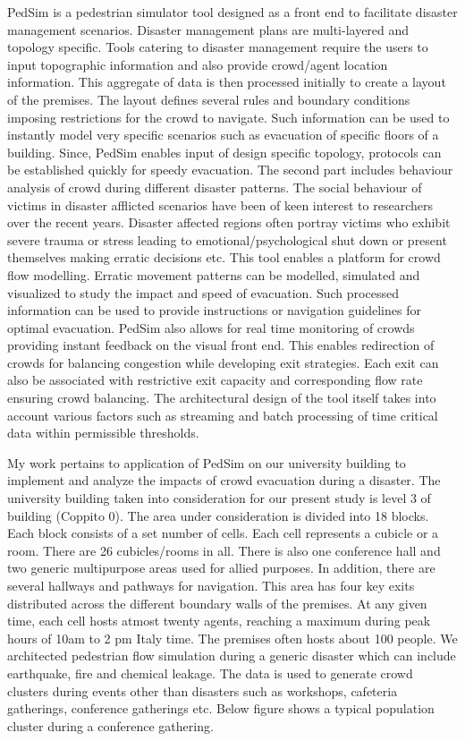 PedSim is a pedestrian simulator tool designed as a front end to facilitate disaster management scenarios. Disaster management plans are multi-layered and topology specific. Tools catering to disaster management require the users to input topographic information and also provide crowd/agent location information. This aggregate of data is then processed initially to create a layout of the premises. The layout defines several rules and boundary conditions imposing restrictions for the crowd to navigate. Such information can be used to instantly model very specific scenarios such as evacuation of specific floors of a building. Since, PedSim enables input of design specific topology, protocols can be established quickly for speedy evacuation. The second part includes behaviour analysis of crowd during different disaster patterns. The social behaviour of victims in disaster afflicted scenarios have been of keen interest to researchers over the recent years. Disaster affected regions often portray victims who exhibit severe trauma or stress leading to emotional/psychological shut down or present themselves making erratic decisions etc. This tool enables a platform for crowd flow modelling. Erratic movement patterns can be modelled, simulated and visualized to study the impact and speed of evacuation. Such processed information can be used to provide instructions or navigation guidelines for optimal evacuation. PedSim also allows for real time monitoring of crowds providing instant feedback on the visual front end. This enables redirection of crowds for balancing congestion while developing exit strategies. Each exit can also be associated with restrictive exit capacity and corresponding flow rate ensuring crowd balancing.  The architectural design of the tool itself takes into account various factors such as streaming and batch processing of time critical data within permissible thresholds.

My work pertains to application of PedSim on our university building to implement and analyze the impacts of crowd evacuation during a disaster. The university building taken into consideration for our present study is level 3 of building (Coppito 0). The area under consideration is divided into 18 blocks. Each block consists of a set number of cells. Each cell represents a cubicle or a room. There are 26 cubicles/rooms in all. There is also one conference hall and two generic multipurpose areas used for allied purposes. In addition, there are several hallways and pathways for navigation. This area has four key exits distributed across the different boundary walls of the premises. At any given time, each cell hosts atmost twenty agents, reaching a maximum during peak hours of 10am to 2 pm Italy time. The premises often hosts about 100 people. We architected pedestrian flow simulation during a generic disaster which can include earthquake, fire and chemical leakage. The data is used to generate crowd clusters during events other than disasters such as workshops, cafeteria gatherings, conference gatherings etc. Below figure shows a typical population cluster during a conference gathering. 

